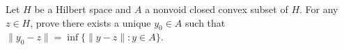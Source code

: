 Let $H$ be a Hilbert space and $A$ a nonvoid closed convex subset of $H$. For any $z \in H$, prove there exists a unique $y_0 \in A$ such that $\|y_0 - z\| = \inf\{\|y - z\| : y \in A\}$.
